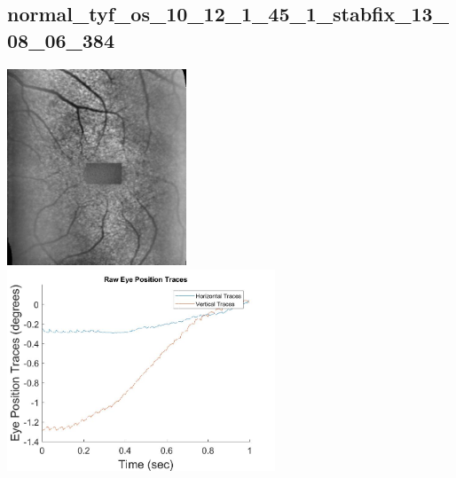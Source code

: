 \documentclass[11pt]{article}
\begin{document}
\subsection{normal\_tyf\_os\_10\_12\_1\_45\_1\_stabfix\_13\_08\_06\_384}
\includegraphics[width=0.40\textwidth, valign=m]{referenceframes/tslo_normal/normal_tyf_os_10_12_1_45_1_stabfix_13_08_06_384_dwt_nostim_gamscaled_bandfilt_refframe.jpg}
\includegraphics[width=0.60\textwidth, valign=m]{eyepositiontraces/tslo_normal/normal_tyf_os_10_12_1_45_1_stabfix_13_08_06_384.jpg}\\
\end{document}

